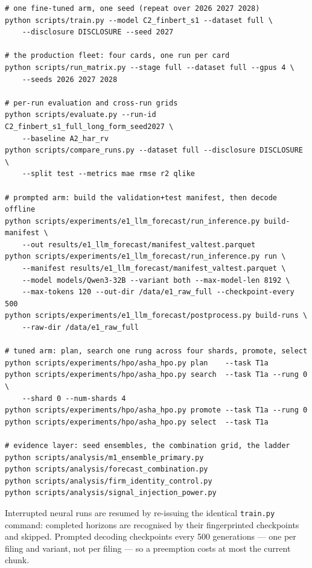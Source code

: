 \begin{verbatim}
# one fine-tuned arm, one seed (repeat over 2026 2027 2028)
python scripts/train.py --model C2_finbert_s1 --dataset full \
    --disclosure DISCLOSURE --seed 2027

# the production fleet: four cards, one run per card
python scripts/run_matrix.py --stage full --dataset full --gpus 4 \
    --seeds 2026 2027 2028

# per-run evaluation and cross-run grids
python scripts/evaluate.py --run-id C2_finbert_s1_full_long_form_seed2027 \
    --baseline A2_har_rv
python scripts/compare_runs.py --dataset full --disclosure DISCLOSURE \
    --split test --metrics mae rmse r2 qlike

# prompted arm: build the validation+test manifest, then decode offline
python scripts/experiments/e1_llm_forecast/run_inference.py build-manifest \
    --out results/e1_llm_forecast/manifest_valtest.parquet
python scripts/experiments/e1_llm_forecast/run_inference.py run \
    --manifest results/e1_llm_forecast/manifest_valtest.parquet \
    --model models/Qwen3-32B --variant both --max-model-len 8192 \
    --max-tokens 120 --out-dir /data/e1_raw_full --checkpoint-every 500
python scripts/experiments/e1_llm_forecast/postprocess.py build-runs \
    --raw-dir /data/e1_raw_full

# tuned arm: plan, search one rung across four shards, promote, select
python scripts/experiments/hpo/asha_hpo.py plan    --task T1a
python scripts/experiments/hpo/asha_hpo.py search  --task T1a --rung 0 \
    --shard 0 --num-shards 4
python scripts/experiments/hpo/asha_hpo.py promote --task T1a --rung 0
python scripts/experiments/hpo/asha_hpo.py select  --task T1a

# evidence layer: seed ensembles, the combination grid, the ladder
python scripts/analysis/m1_ensemble_primary.py
python scripts/analysis/forecast_combination.py
python scripts/analysis/firm_identity_control.py
python scripts/analysis/signal_injection_power.py
\end{verbatim}

Interrupted neural runs are resumed by re-issuing the identical
\texttt{train.py} command: completed horizons are recognised by their
fingerprinted checkpoints and skipped. Prompted decoding checkpoints every 500
generations --- one per filing and variant, not per filing --- so a preemption
costs at most the current chunk. %

